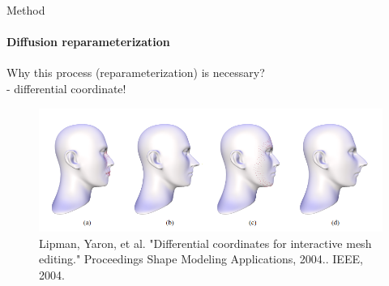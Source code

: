 \documentclass[beamer]{standalone}
\begin{document}
\begin{frame}{Method}
\framesubtitle{Diffusion reparameterization}
    Why this process (reparameterization) is necessary? \\
    - \alert{differential coordinate!}
    \begin{figure}
        \includegraphics[width=\textwidth]{figures/differential_coordinate.png}
        \caption{Lipman, Yaron, et al. "Differential coordinates for interactive mesh editing." Proceedings Shape Modeling Applications, 2004.. IEEE, 2004.}
    \end{figure}
    
\end{frame}
\end{document}
